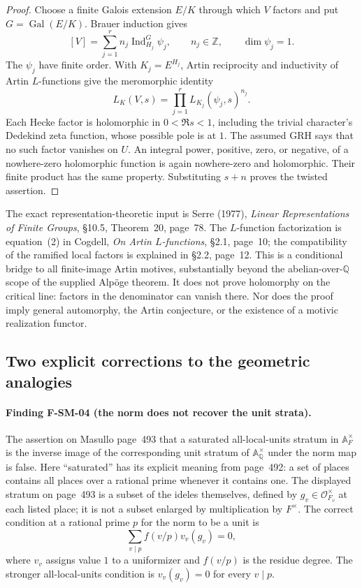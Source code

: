 \begin{proof}
Choose a finite Galois extension $E/K$ through which $V$ factors and put
$G=\operatorname{Gal}(E/K)$.  Brauer induction gives
\[
 [V]=\sum_{j=1}^r n_j\operatorname{Ind}_{H_j}^{G}\psi_j,
 \qquad n_j\in\mathbb Z,\qquad\dim\psi_j=1.
\]
The $\psi_j$ have finite order.  With $K_j=E^{H_j}$, Artin reciprocity
and inductivity of Artin $L$-functions give the meromorphic identity
\[
 L_K(V,s)=\prod_{j=1}^r L_{K_j}(\psi_j,s)^{n_j}.
\]
Each Hecke factor is holomorphic in $0<\Re s<1$, including the trivial
character's Dedekind zeta function, whose possible pole is at $1$.
The assumed GRH says that no such factor vanishes on $U$.  An integral
power, positive, zero, or negative, of a nowhere-zero holomorphic function
is again nowhere-zero and holomorphic.  Their finite product has the same
property.  Substituting $s+n$ proves the twisted assertion.
\end{proof}

The exact representation-theoretic input is Serre (1977),
\emph{Linear Representations of Finite Groups}, \S10.5, Theorem~20,
page~78.  The $L$-function factorization is equation~(2) in Cogdell,
\emph{On Artin $L$-functions}, \S2.1, page~10; the compatibility of the
ramified local factors is explained in \S2.2, page~12.  This is a conditional
bridge to all finite-image Artin motives, substantially beyond the
abelian-over-$\mathbb Q$ scope of the supplied Alp\"oge theorem.
It does not prove holomorphy on the critical line: factors in the denominator
can vanish there.  Nor does the proof imply general automorphy, the Artin
conjecture, or the existence of a motivic realization functor.

\subsection{Two explicit corrections to the geometric analogies}

\paragraph{Finding F-SM-04 (the norm does not recover the unit strata).}
The assertion on Masullo page~493 that a saturated all-local-units stratum
in $\mathbb A_F^\times$ is the inverse image of the corresponding unit
stratum of $\mathbb A_{\mathbb Q}^\times$ under the norm map is false.
Here ``saturated'' has its explicit meaning from page~492: a set of places
contains all places over a rational prime whenever it contains one.
The displayed stratum on page~493 is a subset of the ideles themselves,
defined by $g_v\in\mathcal O_{F_v}^{\times}$ at each listed place;
it is not a subset enlarged by multiplication by $F^{\times}$.
The correct condition at a rational prime $p$ for the norm to be a unit is
\[
 \sum_{v\mid p} f(v/p)v_v(g_v)=0,
\]
where $v_v$ assigns value $1$ to a uniformizer and $f(v/p)$ is the residue
degree.  The stronger all-local-units condition is $v_v(g_v)=0$ for
every $v\mid p$.

